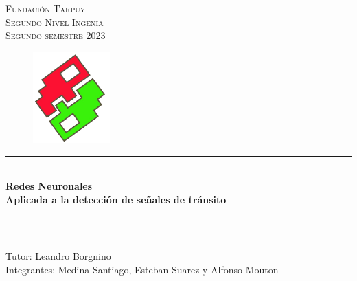 \documentclass[13pt, letterpaper, oneside]{article}
\begin{document}

	\begin{titlepage}
	\newcommand{\HRule}{\rule{\linewidth}{0.5mm}}
	\center %
	\vspace*{4cm}
	\textsc{\Huge Fundación Tarpuy}\\[0.3cm]
	\textsc{\Large Segundo Nivel Ingenia}\\[0.2cm]
	\textsc{Segundo semestre 2023}\\[0.3cm]
	\begin{figure}[ht]
		\centering
		\includegraphics[height=3.5cm]{2}
	\end{figure}

	\HRule \\[0.8cm]
	{ \huge \bfseries Redes Neuronales}\\[0.4cm] %
	{ \large \bfseries Aplicada a la detección de señales de tránsito}\\[0.2cm]
	\HRule \\[1.0cm]
 

	\begin{minipage}{0.8\textwidth}
		\begin{center} \large
			Tutor: Leandro Borgnino \\[0.5cm]
			Integrantes: Medina Santiago, Esteban Suarez y Alfonso Mouton
		\end{center}
	\end{minipage}

	\vspace{1cm}
	\end{titlepage}

	\tableofcontents
	\pagebreak

	
\end{document}
